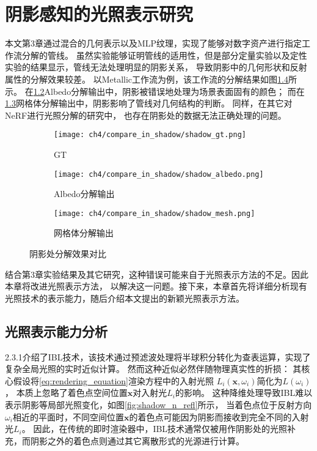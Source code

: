 
\chapter{阴影感知的光照表示研究}

本文第3章通过混合的几何表示以及MLP纹理，实现了能够对数字资产进行指定工作流分解的管线。
虽然实验能够证明管线的适用性，但是部分定量实验以及定性实验的结果显示，管线无法处理明显的阴影关系，
导致阴影中的几何形状和反射属性的分解效果较差。
以Metallic工作流为例，该工作流的分解结果如图\ref{fig:shadow_error}所示。
在\ref{fig:shadow_albedo}Albedo分解输出中，阴影被错误地处理为场景表面固有的颜色；
而在\ref{fig:shadow_mesh}网格体分解输出中，阴影影响了管线对几何结构的判断。
同样，在其它对NeRF进行光照分解的研究中\cite{Zhang_2021, Wu_2023}，
也存在阴影处的数据无法正确处理的问题。

\begin{figure}[H]
  \centering
  \begin{subfigure}[t]{0.3\textwidth}
    \centering
    \texttt{[image: ch4/compare\_in\_shadow/shadow\_gt.png]}
    \caption{GT}
    \label{fig:shadow_gt}
  \end{subfigure}
  \begin{subfigure}[t]{0.3\textwidth}
    \centering
    \texttt{[image: ch4/compare\_in\_shadow/shadow\_albedo.png]}
    \caption{Albedo分解输出}
    \label{fig:shadow_albedo}
  \end{subfigure}
  \begin{subfigure}[t]{0.3\textwidth}
    \centering
    \texttt{[image: ch4/compare\_in\_shadow/shadow\_mesh.png]}
    \caption{网格体分解输出}
    \label{fig:shadow_mesh}
  \end{subfigure}
  \caption{阴影处分解效果对比}
  \label{fig:shadow_error}
\end{figure}

结合第3章实验结果及其它研究，这种错误可能来自于光照表示方法的不足。因此本章将改进光照表示方法，
以解决这一问题。接下来，本章首先将详细分析现有光照技术的表示能力，随后介绍本文提出的新颖光照表示方法。

\section{光照表示能力分析}

2.3.1介绍了IBL技术，该技术通过预滤波处理将半球积分转化为查表运算，实现了复杂全局光照的实时近似计算。
然而这种近似必然伴随物理真实性的折损：
其核心假设将\eqref{eq:rendering_equation}渲染方程中的入射光照
$L_i\left(\mathbf{x},\omega_i\right)$简化为$L(\omega_i)$，
本质上忽略了着色点空间位置$\mathbf{x}$对入射光$L_i$的影响。
这种降维处理导致IBL难以表示阴影等局部光照变化，如图\ref{fig:shadow_n_refl}所示，
当着色点位于反射方向$\omega_i$相近的平面时，不同空间位置$\mathbf{x}$的着色点可能因为阴影而接收到完全不同的入射光$L_i$。
因此，在传统的即时渲染器中，IBL技术通常仅被用作阴影处的光照补充，而阴影之外的着色点则通过其它离散形式的光源进行计算。

